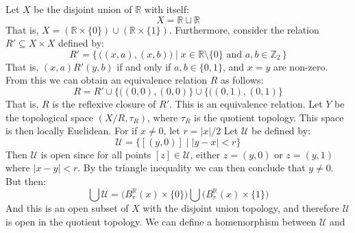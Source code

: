 \documentclass[oneside]{book}                                                  %
\begin{document}
            \begin{example}
                Let $X$ be the disjoint union of $\mathbb{R}$ with itself:
                \begin{equation}
                    X=\mathbb{R}\sqcup\mathbb{R}
                \end{equation}
                That is, $X=(\mathbb{R}\times\{0\})\cup(\mathbb{R}\times\{1\})$.
                Furthermore, consider the relation $R'\subseteq{X}\times{X}$
                defined by:
                \begin{equation}
                    R'=\Big\{\,\Big((x,a),(x,b)\Big)\;\Big|\;
                        x\in\mathbb{R}\setminus\{0\}
                        \textrm{ and }a,b\in\mathbb{Z}_{2}\,\Big\}
                \end{equation}
                That is, $(x,a)R'(y,b)$ if and only if $a,b\in\{0,1\}$, and
                $x=y$ are non-zero. From this we can obtain an equivalence
                relation $R$ as follows:
                \begin{equation}
                    R=R'\cup\big\{\big((0,0),(0,0)\big\}\cup
                        \big\{\big((0,1),(0,1)\big\}
                \end{equation}
                That is, $R$ is the reflexive closure of $R'$. This is an
                equivalence relation. Let $Y$ be the topological space
                $(X/R,\tau_{R})$, where $\tau_{R}$ is the quotient topology.
                This space is then locally Euclidean. For if $x\ne{0}$, let
                $r=|x|/2$ Let $\mathcal{U}$ be defined by:
                \begin{equation}
                    \mathcal{U}=\big\{[(y,0)]\;|\;|y-x|<r\big\}
                \end{equation}
                Then $\mathcal{U}$ is open since for all points
                $[z]\in\mathcal{U}$, either $z=(y,0)$ or $z=(y,1)$ where
                $|x-y|<r$. By the triangle inequality we can then conclude that
                $y\ne{0}$. But then:
                \begin{equation}
                    \bigcup\mathcal{U}=\Big(B_{r}^{\mathbb{R}}(x)\times\{0\}\Big)
                        \bigcup\Big(B_{r}^{\mathbb{R}}(x)\times\{1\}\Big)
                \end{equation}
                And this is an open subset of $X$ with the disjoint union
                topology, and therefore $\mathcal{U}$ is open in the quotient
                topology. We can define a homemorphism between $\mathcal{U}$ and

\end{example}
\end{document}
